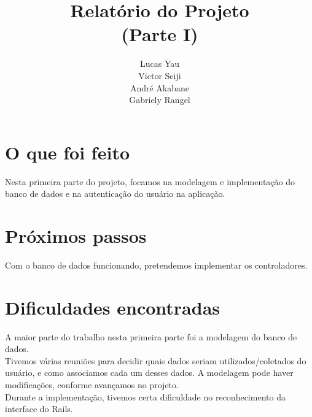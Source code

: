 \documentclass[12pt]{article}
\title{Relatório do Projeto \\ (Parte I)}
\author
{
	Lucas Yau \\
	Victor Seiji \\
	André Akabane \\
	Gabriely Rangel
}
\date{}
\begin{document}
	\maketitle
	
	\section*{O que foi feito}
	Nesta primeira parte do projeto, focamos na modelagem e implementação do banco de dados e na autenticação do usuário na aplicação.
	
	\section*{Próximos passos}
	Com o banco de dados funcionando, pretendemos implementar os controladores.
	
	\section*{Dificuldades encontradas}
	A maior parte do trabalho nesta primeira parte foi a modelagem do banco de dados.\\
	Tivemos várias reuniões para decidir quais dados seriam utilizados/coletados do usuário, e como associamos cada um desses dados. A modelagem pode haver modificações, conforme avançamos no projeto.\\
	Durante a implementação, tivemos certa dificuldade no reconhecimento da interface do Rails.
	
	
\end{document}

